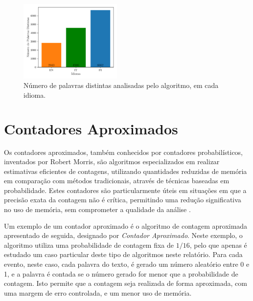 \documentclass[mirror, portugues]{revdetua}
\begin{document}
\begin{figure}[H]
    \centering
    \includegraphics[width=0.45\textwidth]{../assets/exact_distinct_words.png}
    \caption{Número de palavras distintas analisadas pelo algoritmo, em cada idioma.}
    \label{fig:distinc_words}
\end{figure}

\section{Contadores Aproximados}

Os contadores aproximados, também conhecidos por contadores probabilísticos, inventados por Robert Morris, são algoritmos especializados em realizar estimativas eficientes de contagens, utilizando quantidades reduzidas de memória em comparação com métodos tradicionais, através de técnicas baseadas em probabilidade. Estes contadores são particularmente úteis em situações em que a precisão exata da contagem não é crítica, permitindo uma redução significativa no uso de memória, sem comprometer a qualidade da análise \cite{RM78}.

Um exemplo de um contador aproximado é o algoritmo de contagem aproximada apresentado de seguida, designado por \textit{Contador Aproximado}. Neste exemplo, o algoritmo utiliza uma probabilidade de contagem fixa de $1/16$, pelo que apenas é estudado um caso particular deste tipo de algoritmos neste relatório. Para cada evento, neste caso, cada palavra do texto, é gerado um número aleatório entre 0 e 1, e a palavra é contada se o número gerado for menor que a probabilidade de contagem. Isto permite que a contagem seja realizada de forma aproximada, com uma margem de erro controlada, e um menor uso de memória.
\end{document}
